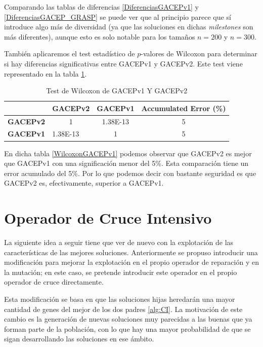 Comparando las tablas de diferencias \ref{DiferenciasGACEPv1} y \ref{DiferenciasGACEP_GRASP} se puede ver que al principio parece que sí introduce algo más de diversidad (ya que las soluciones en dichas \textit{milestones} son más diferentes), aunque esto es solo notable para los tamaños $n=200$ y $n=300$. 

También aplicaremos el test estadístico de $p$-valores de Wilcoxon para determinar si hay diferencias significativas entre GACEPv1 y GACEPv2. 
Este test viene representado en la tabla \ref{WilcoxonGACEPv2}.

\begin{table}[h]
\begin{tabular}{c|c|c|c|}
\cline{2-4}
\multicolumn{1}{l|}{}                  & \textbf{GACEPv2}                                     & \textbf{GACEPv1}                & \textbf{Accumulated Error   (\%)} \\ \hline
\multicolumn{1}{|c|}{\textbf{GACEPv2}} & 1                                                    & {\color[HTML]{0000FF} 1.38E-13} & 5                                 \\ \hline
\multicolumn{1}{|c|}{\textbf{GACEPv1}} & \multicolumn{1}{l|}{{\color[HTML]{FF0000} 1.38E-13}} & 1                               & 5                                 \\ \hline
\end{tabular}
\caption{\label{WilcoxonGACEPv2}Test de Wilcoxon de GACEPv1 Y GACEPv2}
\end{table}

En dicha tabla \ref{WilcoxonGACEPv1} podemos observar que GACEPv2 es mejor que GACEPv1 con una significación menor del 5\%. 
Esta comparación tiene un error acumulado del 5\%. 
Por lo que podemos decir con bastante seguridad es que GACEPv2 es, efectivamente, superior a GACEPv1.

\section{Operador de Cruce Intensivo}

La siguiente idea a seguir tiene que ver de nuevo con la explotación de las características de las mejores soluciones. 
Anteriormente se propuso introducir una modificación para mejorar la explotación en el propio operador de reparación y en la mutación; en este caso, se pretende introducir este operador en el propio operador de cruce directamente. 

Esta modificación se basa en que las soluciones hijas heredarán una mayor cantidad de genes del mejor de los dos padres \ref{alg:CI}. 
La motivación de este cambio es la generación de nuevas soluciones muy parecidas a las buenas que ya forman parte de la población, con lo que hay una mayor probabilidad de que se sigan desarrollando las soluciones en ese ámbito. 

